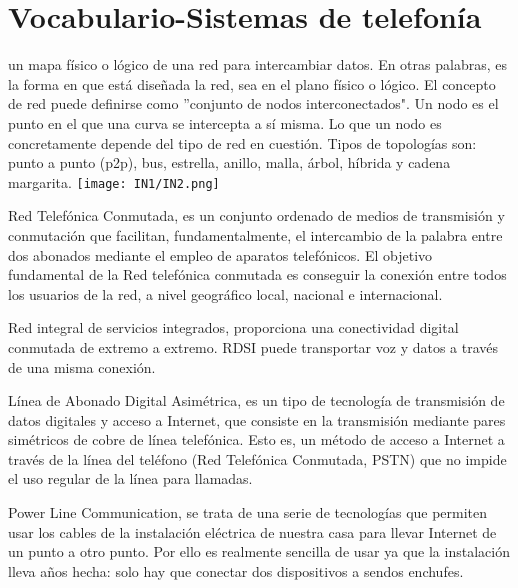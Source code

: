 \documentclass[
	11pt, %
	fleqn, %
	a4paper, %
]{LegrandOrangeBook}
\begin{document}
\section*{Vocabulario-Sistemas de telefonía}
\begin{vocabulary}
un mapa físico o lógico de una red para intercambiar datos. En otras palabras, es la forma en que está diseñada la red, sea en el plano físico o lógico. El concepto de red puede definirse como ''conjunto de nodos interconectados". Un nodo es el punto en el que una curva se intercepta a sí misma. Lo que un nodo es concretamente depende del tipo de red en cuestión. Tipos de topologías son: punto a punto (p2p), bus, estrella, anillo, malla, árbol, híbrida y cadena margarita.
\texttt{[image: IN1/IN2.png]}
\end{vocabulary}
\begin{vocabulary}[RTC]
Red Telefónica Conmutada, es un conjunto ordenado de medios de transmisión y conmutación que facilitan, fundamentalmente, el intercambio de la palabra entre dos abonados mediante el empleo de aparatos telefónicos. El objetivo fundamental de la Red telefónica conmutada es conseguir la conexión entre todos los usuarios de la red, a nivel geográfico local, nacional e internacional.
\end{vocabulary}
\begin{vocabulary}[RDSI]
Red integral de servicios integrados, proporciona una conectividad digital conmutada de extremo a extremo. RDSI puede transportar voz y datos a través de una misma conexión.
\end{vocabulary}
\begin{vocabulary}[ADSL]
Línea de Abonado Digital Asimétrica, es un tipo de tecnología de transmisión de datos digitales y acceso a Internet, que consiste en la transmisión mediante pares simétricos de cobre de línea telefónica. Esto es, un método de acceso a Internet a través de la línea del teléfono (Red Telefónica Conmutada, PSTN) que no impide el uso regular de la línea para llamadas.
\end{vocabulary}
\begin{vocabulary}[PLC]
Power Line Communication, se trata de una serie de tecnologías que permiten usar los cables de la instalación eléctrica de nuestra casa para llevar Internet de un punto a otro punto. Por ello es realmente sencilla de usar ya que la instalación lleva años hecha: solo hay que conectar dos dispositivos a sendos enchufes.
\end{vocabulary}
\end{document}
